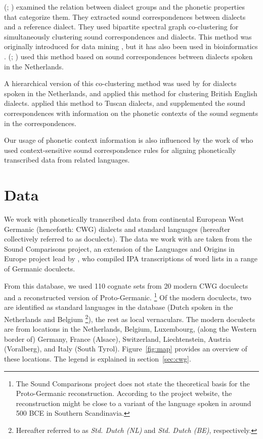 \documentclass[a4paper]{article}
\begin{document}
\citeauthor{wieling2011bipartite} (\citeyear{wieling2009bipartite}; \citeyear{wieling2011bipartite})
examined the relation between dialect groups and
the phonetic properties that categorize them.
They extracted sound correspondences between dialects
and a reference dialect.
They used bipartite spectral graph co-clustering
for simultaneously clustering sound correspondences and dialects.
This method was originally introduced for data mining
\citep{dhillon2001co-clustering, zha2001bipartite},
but it has also been used in bioinformatics \citep{kluger2003spectral}.
\citeauthor{wieling2011bipartite}
(\citeyear{wieling2009bipartite}; \citeyear{wieling2011bipartite})
used this method based on sound correspondences between dialects
spoken in the Netherlands.

A hierarchical version of this co-clustering method
was used by \citet{wieling2010hierarchical} for
dialects spoken in the Netherlands,
and \citet{wieling2013analyzing} applied this method for
clustering British English dialects.
\citet{montemagni2013synchronic} applied this method to Tuscan dialects,
and supplemented the sound correspondences with information
on the phonetic contexts of the sound segments in the correspondences.

Our usage of phonetic context information is also
influenced by the work of \citet{wettig2012using}
who used context-sensitive sound correspondence rules
for aligning phonetically transcribed data from related languages.

\section{Data}
\label{sec:data}

We work with phonetically transcribed data from
continental European West Germanic (henceforth: CWG)
dialects and standard languages
(hereafter collectively referred to as doculects).
The data we work with are taken from the Sound Comparisons project,
an extension of the Languages and Origins in Europe project \citep{renfrew2009languages}
lead by \citet{heggarty2018sound},
who compiled IPA transcriptions of word lists
in a range of Germanic doculects.

From this database,
we used 110 cognate sets from 20 modern CWG doculects
and a reconstructed version of Proto-Germanic.%
\footnote{%
The Sound Comparisons project does not state
the theoretical basis for the Proto-Germanic reconstruction.
According to the project website,
the reconstruction might be close to
a variant of the language spoken in around 500 BCE
in Southern Scandinavia.
}
Of the modern doculects, two are identified as standard languages
in the database (Dutch spoken in the Netherlands and Belgium%
\footnote{%
Hereafter referred to as \textit{Std. Dutch (NL)}
and \textit{Std. Dutch (BE)}, respectively.
}),
the rest as local vernaculars.
The modern doculects are from locations in the
Netherlands, Belgium, Luxembourg, (along the Western border of) Germany,
France (Alsace), Switzerland, Liechtenstein, Austria (Voralberg), and Italy (South Tyrol).
Figure~\ref{fig:map} provides an overview of these locations.
The legend is explained in section~\ref{sec:cwg}.
\end{document}
